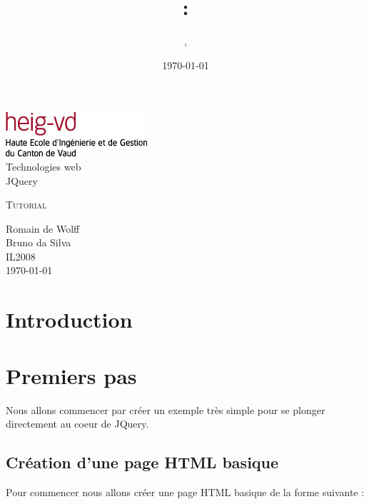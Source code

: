 \documentclass[10pt,a4paper,titlepage]{article}
\author{\auteurOne, \auteurTwo}
\title{\branchetag : \laboname}
\date{\today}
\newcommand{\branche}{Technologies web}
\newcommand{\laboname}{JQuery}
\newcommand{\auteurOne}{Romain de Wolff}
\newcommand{\auteurTwo}{Bruno da Silva}
\newcommand{\promo}{IL2008}
\begin{document}
\pagestyle{headings}
\begin{titlepage}
	\begin{center}
	\includegraphics{img/logo-HEIG-VD.jpg}\\
		\vspace{3cm}
		\LARGE \branche %
		\vspace{3cm}\\
		\Huge \laboname \\
		\vspace{3cm}

		\Large \textsc{Tutorial} \\
		\vspace{3cm}

		\large \auteurOne \\
		\auteurTwo \\	
		\vspace{10pt}
		\normalsize \textsc{\promo} \\

		\vspace{2cm}
		\today
	\end{center}
\end{titlepage}

\tableofcontents
\newpage
\pagestyle{fancy}
\section{Introduction}


\newpage

\section{Premiers pas}

Nous allons commencer par créer un exemple très simple pour se plonger directement  au coeur de JQuery.

\subsection{Création d'une page HTML basique}

Pour commencer nous allons créer une page HTML basique de la forme suivante :
\end{document}
